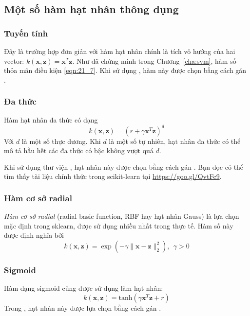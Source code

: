 \subsection{Một số hàm hạt nhân thông dụng}
\subsubsection{Tuyến tính}
Đây là trường hợp đơn giản với hàm hạt nhân chính là tích vô hướng của hai vector:  
$k(\mathbf{x}, \mathbf{z}) = \mathbf{x}^T\mathbf{z}$.
Như đã chứng minh trong Chương~\ref{cha:svm}, hàm số thỏa mãn điều kiện \eqref{eqn:21_7}. Khi sử dụng , hàm này được chọn bằng cách gán 
. 
 
 
\subsubsection{Đa thức}
Hàm hạt nhân đa thức có dạng 
\begin{equation} 
k(\mathbf{x}, \mathbf{z}) = (r + \gamma \mathbf{x}^T\mathbf{z})^d 
\end{equation} 
Với $d$ là một số thực dương. Khi $d$ là một số tự nhiên, hạt nhân đa thức có thể mô tả hầu hết các đa thức có bậc không
vượt quá $d$.

Khi sử dụng thư viện , hạt nhân này được chọn bằng cách gán
. Bạn đọc có thể tìm thấy tài liệu
chính thức trong scikit-learn tại \url{https://goo.gl/QvtFc9}. 
 
\subsubsection{Hàm cơ sở radial}
\textit{Hàm cơ sở radial} (radial basic function, RBF hay hạt nhân Gauss) là lựa chọn mặc định trong sklearn, được sử dụng nhiều nhất trong thực tế. Hàm số này được định nghĩa bởi
\begin{equation} 
k(\mathbf{x}, \mathbf{z}) = \exp(-\gamma \|\mathbf{x} - \mathbf{z}\|_2^2), ~~ \gamma > 0 
\end{equation}  
 
\subsubsection{Sigmoid }
Hàm dạng sigmoid cũng được sử dụng làm hạt nhân:
\begin{equation} 
k(\mathbf{x}, \mathbf{z}) = \text{tanh}(\gamma \mathbf{x}^T\mathbf{z} + r) 
\end{equation} 
Trong , hạt nhân này được lựa chọn bằng cách gán .
 
